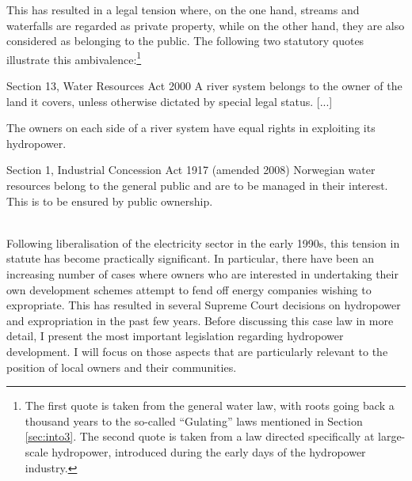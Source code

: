 
This has resulted in a legal tension where, on the one hand, streams and waterfalls are regarded as private property, while on the other hand, they are also considered as belonging to the public. The following two statutory quotes illustrate this ambivalence:\footnote{The first quote is taken from the general water law, with roots going back a thousand years to the so-called ``Gulating'' laws mentioned in Section \ref{sec:into3}. The second quote is taken from a law directed specifically at large-scale hydropower, introduced during the early days of the hydropower industry.}

{\begin{minipage}[t]{16em}
 \begin{aquote}{\tiny Section 13, Water Resources Act 2000} \footnotesize A river system belongs to the owner of the land it covers, unless otherwise dictated by special legal status. [...]

The owners on each side of a river system have equal rights in exploiting its hydropower.
\end{aquote}  
\end{minipage}}
{\begin{minipage}[t]{22em}
\begin{aquote}{\tiny Section 1, Industrial Concession Act 1917 (amended 2008)} \footnotesize Norwegian water resources belong to the general public and are to be managed in their interest. This is to be ensured by public ownership.
\end{aquote}
\end{minipage}} \\

Following liberalisation of the electricity sector in the early 1990s, this tension in statute has become practically significant. In particular, there have been an increasing number of cases where owners who are interested in undertaking their own development schemes attempt to fend off energy companies wishing to expropriate. This has resulted in several Supreme Court decisions on hydropower and expropriation in the past few years. Before discussing this case law in more detail, I present the most important legislation regarding hydropower development. I will focus on those aspects that are particularly relevant to the position of local owners and their communities.

